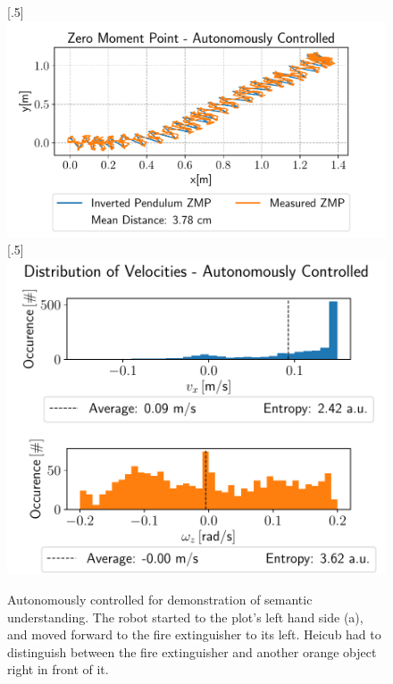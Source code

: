 \begin{figure}[h!]
	[.5\linewidth]{\includegraphics[scale=.45]{chapters/04_experiments/02_autonomous_walking/semantic_walk_01_zmp.pdf}}
	[.5\linewidth]{\includegraphics[scale=.45]{chapters/04_experiments/02_autonomous_walking/semantic_walk_01_entropy.pdf}}
	\caption{Autonomously controlled for demonstration of semantic understanding. The robot started to the plot's left hand side (a), and moved forward to the fire extinguisher to its left. Heicub had to distinguish between the fire extinguisher and another orange object right in front of it.}
	\label{fig::424_aw_additional_semantic}
\end{figure}
